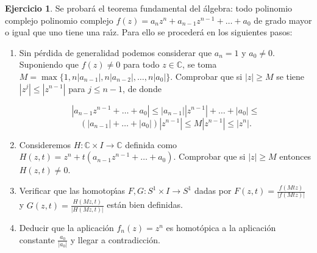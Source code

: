 \documentclass{article}
\theoremstyle{plain}
\theoremstyle{definition}
\newtheorem{exercise}{Ejercicio}
\begin{document}
\begin{exercise} Se probar\'a el teorema fundamental del \'algebra: todo polinomio complejo
polinomio complejo $f(z)=a_nz^n + a_{n-1}z^{n-1}+\dots + a_0$
de grado mayor o igual que uno tiene una ra\'{\i}z. Para ello se proceder\'a en los siguientes pasos:
\begin{enumerate}
\item Sin p\'erdida de generalidad podemos considerar que $a_n=1$ y $a_0 \neq 0$.
Suponiendo que $f(z)\neq 0$ para todo $z\in \mathbb{C}$, se toma $M = \max\{1, n|a_{n-1}|, n|a_{n-2}|, \dots ,n|a_0|\}$. Comprobar que si $|z|\ge M$ se tiene $|z^j|\leq |z^{n-1}|$ para $j\leq n-1$, de donde

$$
|a_{n-1}z^{n-1}+\dots + a_0|\le |a_{n-1}| |z^{n-1}|+\dots + |a_0| \le
$$
$$ (|a_{n-1}|+\dots + |a_0|)|z^{n-1}|
\le M |z^{n-1}|\le |z^n|.
$$
\item Consideremos $H:\mathbb{C} \times I \to \mathbb{C}$ definida como
$H(z,t)=z^n+t(a_{n-1}z^{n-1}+\dots + a_0)$. Comprobar que si $|z|\ge M$ entonces
$H(z,t)\ne 0$.
\item Verificar que las homotop\'{\i}as $F, G: S^1\times I \to S^1$ dadas por
$F(z,t)=\frac{f(Mtz)}{|f(Mtz)|}$
y $G(z,t)=\frac{H(Mz,t)}{|H(Mz,t)|}$ est\'an bien definidas.
\item Deducir que la aplicaci\'on $f_n(z)=z^n$ es homot\'opica a la aplicaci\'on constante
$\frac{a_0}{|a_0|}$ y llegar a contradicci\'on.
\end{enumerate}
\end{exercise}
\end{document}
